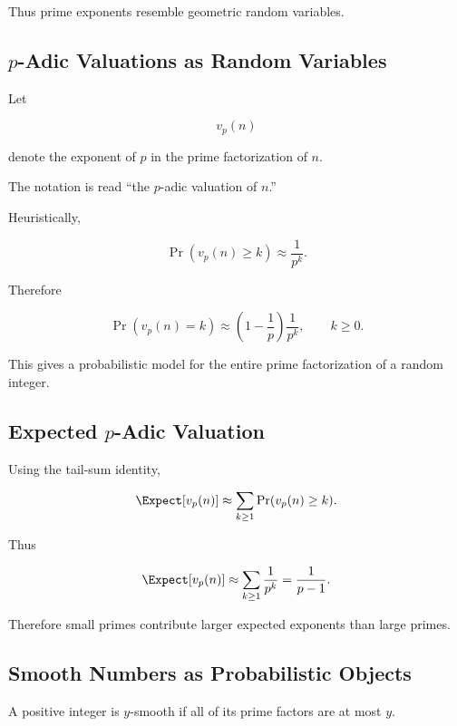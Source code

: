 Thus prime exponents resemble geometric random variables.

\subsection{\(p\)-Adic Valuations as Random Variables}
\label{subsec:padic-valuations-random}

Let

\[ v_p(n) \]

denote the exponent of \(p\) in the prime factorization of \(n\).

The notation is read ``the \(p\)-adic valuation of \(n\).''

Heuristically,

\[ \Pr(v_p(n)\geq k)\approx\frac1{p^k}. \]

Therefore

\[
\Pr(v_p(n)=k)
\approx
\left(1-\frac1p\right)\frac1{p^k},
\qquad k\geq0.
\]

This gives a probabilistic model for the entire prime factorization of a
random integer.

\subsection{Expected \(p\)-Adic Valuation}
\label{subsec:expected-padic-valuation}

Using the tail-sum identity,

\[
\Expect[v_p(n)]
\approx
\sum_{k\geq1}\Pr(v_p(n)\geq k).
\]

Thus

\[
\Expect[v_p(n)]
\approx
\sum_{k\geq1}\frac1{p^k}
=
\frac1{p-1}.
\]

Therefore small primes contribute larger expected exponents than large
primes.

\subsection{Smooth Numbers as Probabilistic Objects}
\label{subsec:probabilistic-smooth-numbers}

A positive integer is \(y\)-smooth if all of its prime factors are at most
\(y\).

